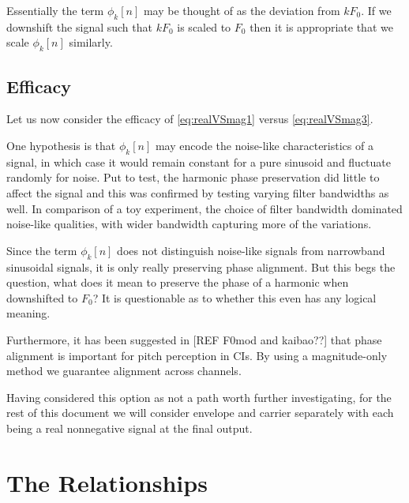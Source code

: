 \documentclass [11pt, proquest,oneside] {ganter_thesis}[2015/03/03]
\begin{document}
Essentially the term $\phi_k[n]$ may be thought of as the deviation from $kF_0$.  If we downshift the signal such that $kF_0$ is scaled to $F_0$ then it is appropriate that we scale $\phi_k[n]$ similarly.

\subsection{Efficacy}

Let us now consider the efficacy of \ref{eq:realVSmag1} versus  \ref{eq:realVSmag3}.

One hypothesis is that $\phi_k[n]$ may encode the noise-like characteristics of a signal, in which case it would remain constant for a pure sinusoid and fluctuate randomly for noise.  Put to test, the harmonic phase preservation did little to affect the signal and this was confirmed by testing varying filter bandwidths as well.  In comparison of a toy experiment, the choice of filter bandwidth dominated noise-like qualities, with wider bandwidth capturing more of the variations.

Since the term $\phi_k[n]$ does not distinguish noise-like signals from narrowband sinusoidal signals, it is only really preserving phase alignment.  But this begs the question, what does it mean to preserve the phase of a harmonic when downshifted to $F_0$?  It is questionable as to whether this even has any logical meaning.


Furthermore, it has been suggested in [REF F0mod and kaibao??] that phase alignment is important for pitch perception in CIs.  By using a magnitude-only method we guarantee alignment across channels.


Having considered this option as not a path worth further investigating, for the rest of this document we will consider envelope and carrier separately with each being a real nonnegative signal at the final output.

\section{The Relationships}
\end{document}
